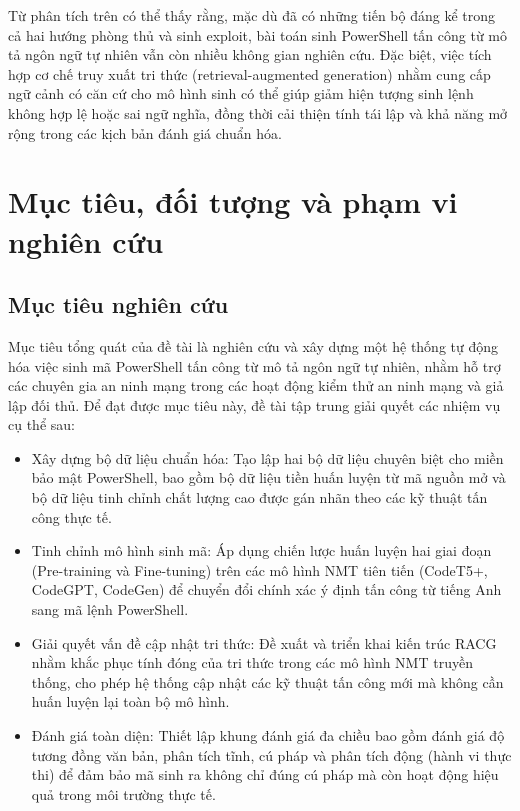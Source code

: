 Từ phân tích trên có thể thấy rằng, mặc dù đã có những tiến bộ đáng kể trong cả hai hướng phòng thủ và sinh exploit, bài toán sinh PowerShell tấn công từ mô tả ngôn ngữ tự nhiên vẫn còn nhiều không gian nghiên cứu. Đặc biệt, việc tích hợp cơ chế truy xuất tri thức (retrieval-augmented generation) nhằm cung cấp ngữ cảnh có căn cứ cho mô hình sinh có thể giúp giảm hiện tượng sinh lệnh không hợp lệ hoặc sai ngữ nghĩa, đồng thời cải thiện tính tái lập và khả năng mở rộng trong các kịch bản đánh giá chuẩn hóa.




\section{Mục tiêu, đối tượng và phạm vi nghiên cứu}
\subsection{Mục tiêu nghiên cứu}

Mục tiêu tổng quát của đề tài là nghiên cứu và xây dựng một hệ thống tự động hóa việc sinh mã PowerShell tấn công từ mô tả ngôn ngữ tự nhiên, nhằm hỗ trợ các chuyên gia an ninh mạng trong các hoạt động kiểm thử an ninh mạng và giả lập đối thủ. Để đạt được mục tiêu này, đề tài tập trung giải quyết các nhiệm vụ cụ thể sau:
\begin{itemize}
\item Xây dựng bộ dữ liệu chuẩn hóa: Tạo lập hai bộ dữ liệu chuyên biệt cho miền bảo mật PowerShell, bao gồm bộ dữ liệu tiền huấn luyện từ mã nguồn mở và bộ dữ liệu tinh chỉnh chất lượng cao được gán nhãn theo các kỹ thuật tấn công thực tế.
\item Tinh chỉnh mô hình sinh mã: Áp dụng chiến lược huấn luyện hai giai đoạn (Pre-training và Fine-tuning) trên các mô hình NMT tiên tiến (CodeT5+, CodeGPT, CodeGen) để chuyển đổi chính xác ý định tấn công từ tiếng Anh sang mã lệnh PowerShell.
\item Giải quyết vấn đề cập nhật tri thức: Đề xuất và triển khai kiến trúc RACG nhằm khắc phục tính đóng của tri thức trong các mô hình NMT truyền thống, cho phép hệ thống cập nhật các kỹ thuật tấn công mới mà không cần huấn luyện lại toàn bộ mô hình.
\item Đánh giá toàn diện: Thiết lập khung đánh giá đa chiều bao gồm đánh giá độ tương đồng văn bản, phân tích tĩnh, cú pháp và phân tích động (hành vi thực thi) để đảm bảo mã sinh ra không chỉ đúng cú pháp mà còn hoạt động hiệu quả trong môi trường thực tế.
\end{itemize}

